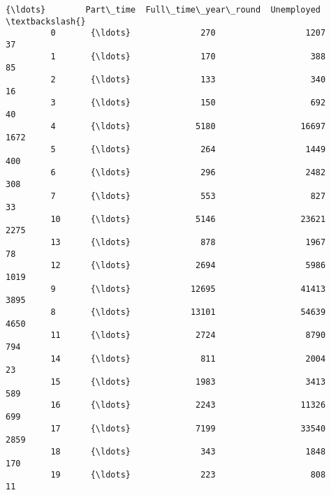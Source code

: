 \documentclass[11pt]{article}
\begin{document}
\begin{Verbatim}[commandchars=\\\{\}]
                 {\ldots}        Part\_time  Full\_time\_year\_round  Unemployed  \textbackslash{}
         0       {\ldots}              270                  1207          37   
         1       {\ldots}              170                   388          85   
         2       {\ldots}              133                   340          16   
         3       {\ldots}              150                   692          40   
         4       {\ldots}             5180                 16697        1672   
         5       {\ldots}              264                  1449         400   
         6       {\ldots}              296                  2482         308   
         7       {\ldots}              553                   827          33   
         10      {\ldots}             5146                 23621        2275   
         13      {\ldots}              878                  1967          78   
         12      {\ldots}             2694                  5986        1019   
         9       {\ldots}            12695                 41413        3895   
         8       {\ldots}            13101                 54639        4650   
         11      {\ldots}             2724                  8790         794   
         14      {\ldots}              811                  2004          23   
         15      {\ldots}             1983                  3413         589   
         16      {\ldots}             2243                 11326         699   
         17      {\ldots}             7199                 33540        2859   
         18      {\ldots}              343                  1848         170   
         19      {\ldots}              223                   808          11   
         

\end{Verbatim}
\end{document}
